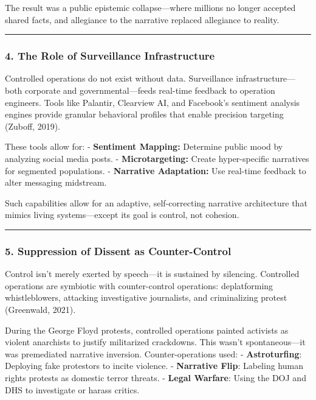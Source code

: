 The result was a public epistemic collapse---where millions no longer
accepted shared facts, and allegiance to the narrative replaced
allegiance to reality.

\begin{center}\rule{0.5\linewidth}{0.5pt}\end{center}

\subsubsection{4. The Role of Surveillance
Infrastructure}\label{the-role-of-surveillance-infrastructure}

Controlled operations do not exist without data. Surveillance
infrastructure---both corporate and governmental---feeds real-time
feedback to operation engineers. Tools like Palantir, Clearview AI, and
Facebook's sentiment analysis engines provide granular behavioral
profiles that enable precision targeting (Zuboff, 2019).

These tools allow for: - \textbf{Sentiment Mapping:} Determine public
mood by analyzing social media posts. - \textbf{Microtargeting:} Create
hyper-specific narratives for segmented populations. - \textbf{Narrative
Adaptation:} Use real-time feedback to alter messaging midstream.

Such capabilities allow for an adaptive, self-correcting narrative
architecture that mimics living systems---except its goal is control,
not cohesion.

\begin{center}\rule{0.5\linewidth}{0.5pt}\end{center}

\subsubsection{5. Suppression of Dissent as
Counter-Control}\label{suppression-of-dissent-as-counter-control}

Control isn't merely exerted by speech---it is sustained by silencing.
Controlled operations are symbiotic with counter-control operations:
deplatforming whistleblowers, attacking investigative journalists, and
criminalizing protest (Greenwald, 2021).

During the George Floyd protests, controlled operations painted
activists as violent anarchists to justify militarized crackdowns. This
wasn't spontaneous---it was premediated narrative inversion.
Counter-operations used: - \textbf{Astroturfing}: Deploying fake
protestors to incite violence. - \textbf{Narrative Flip}: Labeling human
rights protests as domestic terror threats. - \textbf{Legal Warfare}:
Using the DOJ and DHS to investigate or harass critics.

